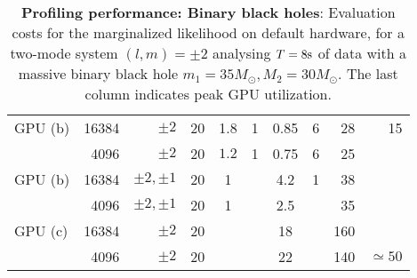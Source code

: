\documentclass[twocolumn,prd,nofootinbib]{revtex4}
\newcommand\unit[1]{{\rm #1}}
\newcommand\editremark[1]{{\color{red} #1}}
\begin{document}
\begin{table*}
\begin{tabular}{lrr|ccccc|rr}
GPU (b) & 16384 & $\pm 2$ & 20  & 1.8 & 1 & \editremark{0.85}& \editremark{6} &28 & 15\\
       & 4096 & $\pm 2$  & 20 & $1.2 $ &  1  & \editremark{0.75} & \editremark{6}  & 25\\ \hline
GPU (b) & 16384 & $\pm 2, \pm 1$ & 20 & 1 && 4.2 & \editremark{1}  & 38  \\
       & 4096 & $\pm 2, \pm 1$ & 20 & 1&& 2.5  && 35 & \\ \hline
%
GPU (c) & 16384 & $\pm 2 $  & 20  & & & 18& &160 &  \\
            & 4096 &$\pm 2 $  &  20 &  & & 22  & & 140 & $\simeq 50$ \\
\end{tabular}
\caption{\label{tab:CostBreakdown}\textbf{Profiling performance: Binary black holes}: Evaluation costs for the
  marginalized likelihood on default
  hardware, for a two-mode system $(l,m)=\pm 2$ analysing $T=8\unit{s}$ of data with a massive binary black hole
  $m_1=35 M_\odot,M_2=30 M_\odot$.  The last column indicates peak GPU utilization.}
\end{table*}
\end{document}
